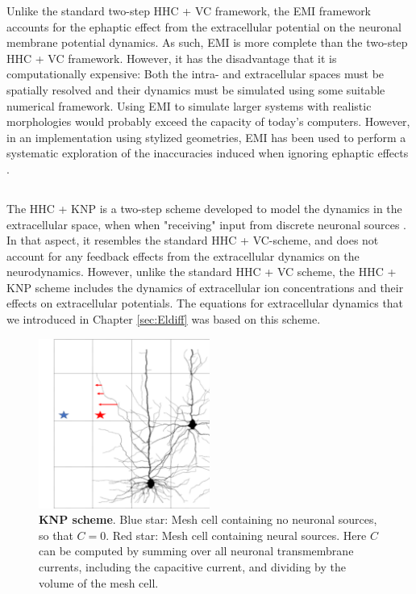 Unlike the standard two-step HHC + VC framework, the EMI framework accounts for the ephaptic 
effect from the extracellular potential on the neuronal membrane potential dynamics. As such, EMI is more complete than the two-step HHC + VC framework. However, it has the disadvantage that it is computationally expensive: Both the intra- and extracellular spaces must be spatially resolved and their dynamics must be simulated using some suitable numerical framework. Using EMI to simulate larger systems with realistic morphologies would probably exceed the capacity of today's computers. However, in an implementation using stylized geometries, EMI has been used to perform a systematic exploration of the inaccuracies induced when ignoring ephaptic effects \cite{Tveito2019}.


\subsection{}
\label{sec:Schemes:KNP}
The HHC + KNP is a two-step scheme developed to model the dynamics in the extracellular space, when when "receiving" input from discrete neuronal sources  \cite{Solbra2018}. In that aspect, it resembles the standard HHC + VC-scheme, and does not account for any feedback effects from the extracellular dynamics on the neurodynamics. However, unlike the standard HHC + VC scheme, the HHC + KNP scheme includes the dynamics of extracellular ion concentrations and their effects on extracellular potentials. The equations for extracellular dynamics that we introduced in Chapter \ref{sec:Eldiff} was based on this scheme.

\begin{figure}[!ht]
\begin{center}
\includegraphics[width=0.5\textwidth]{Figures/Eldiff/KNP.png}
\end{center}
\caption{\textbf{KNP scheme}. Blue star: Mesh cell containing no neuronal sources, so that $C=0$. Red star: Mesh cell containing neural sources. Here $C$ can be computed by summing over all neuronal transmembrane currents, including the capacitive current, and dividing by the volume of the mesh cell. }
\label{Eldiff:fig:KNPmesh}
\end{figure}

